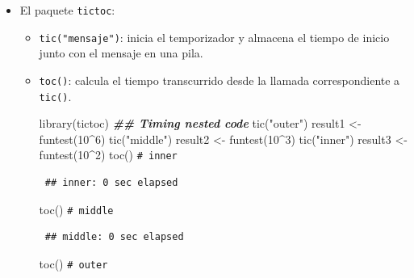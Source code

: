 \documentclass[
]{book}
\newenvironment{Shaded}{\begin{snugshade}}{\end{snugshade}}
\newcommand{\CommentTok}[1]{\textcolor[rgb]{0.56,0.35,0.01}{\textit{#1}}}
\newcommand{\DecValTok}[1]{\textcolor[rgb]{0.00,0.00,0.81}{#1}}
\newcommand{\DocumentationTok}[1]{\textcolor[rgb]{0.56,0.35,0.01}{\textbf{\textit{#1}}}}
\newcommand{\FunctionTok}[1]{\textcolor[rgb]{0.00,0.00,0.00}{#1}}
\newcommand{\NormalTok}[1]{#1}
\newcommand{\OtherTok}[1]{\textcolor[rgb]{0.56,0.35,0.01}{#1}}
\newcommand{\SpecialCharTok}[1]{\textcolor[rgb]{0.00,0.00,0.00}{#1}}
\newcommand{\StringTok}[1]{\textcolor[rgb]{0.31,0.60,0.02}{#1}}
\theoremstyle{break}
\theoremstyle{nonumberplain}
\renewcommand{\CommentTok}[1]{\textcolor[rgb]{0.41,0.41,0.41}{\texttt{#1}}}
\begin{document}
\begin{itemize}
\item
  El paquete \texttt{tictoc}:

  \begin{itemize}
  \item
    \texttt{tic("mensaje")}: inicia el temporizador y almacena el tiempo de inicio junto con el mensaje en una pila.
  \item
    \texttt{toc()}: calcula el tiempo transcurrido desde la llamada correspondiente a \texttt{tic()}.

\begin{Shaded}
\begin{Highlighting}[]
\FunctionTok{library}\NormalTok{(tictoc)}
\DocumentationTok{\#\# Timing nested code}
\FunctionTok{tic}\NormalTok{(}\StringTok{"outer"}\NormalTok{)}
\NormalTok{   result1 }\OtherTok{\textless{}{-}} \FunctionTok{funtest}\NormalTok{(}\DecValTok{10}\SpecialCharTok{\^{}}\DecValTok{6}\NormalTok{)}
   \FunctionTok{tic}\NormalTok{(}\StringTok{"middle"}\NormalTok{)}
\NormalTok{      result2 }\OtherTok{\textless{}{-}} \FunctionTok{funtest}\NormalTok{(}\DecValTok{10}\SpecialCharTok{\^{}}\DecValTok{3}\NormalTok{)}
      \FunctionTok{tic}\NormalTok{(}\StringTok{"inner"}\NormalTok{)}
\NormalTok{         result3 }\OtherTok{\textless{}{-}} \FunctionTok{funtest}\NormalTok{(}\DecValTok{10}\SpecialCharTok{\^{}}\DecValTok{2}\NormalTok{)}
      \FunctionTok{toc}\NormalTok{() }\CommentTok{\# inner}
\end{Highlighting}
\end{Shaded}

\begin{verbatim}
 ## inner: 0 sec elapsed
\end{verbatim}

\begin{Shaded}
\begin{Highlighting}[]
   \FunctionTok{toc}\NormalTok{() }\CommentTok{\# middle}
\end{Highlighting}
\end{Shaded}

\begin{verbatim}
 ## middle: 0 sec elapsed
\end{verbatim}

\begin{Shaded}
\begin{Highlighting}[]
\FunctionTok{toc}\NormalTok{() }\CommentTok{\# outer}
\end{Highlighting}
\end{Shaded}


\end{itemize}
\end{itemize}
\end{document}
